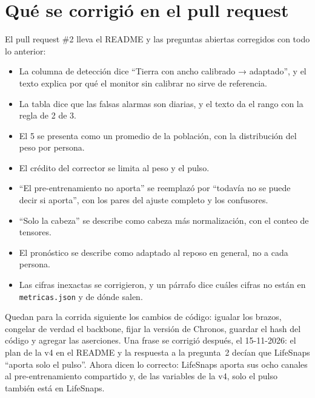 \section{Qué se corrigió en el pull request}

El pull request \#2 lleva el README y las preguntas abiertas corregidos con todo lo anterior:
\begin{itemize}
\item La columna de detección dice \enquote{Tierra con ancho calibrado → adaptado}, y el texto explica por qué el
  monitor sin calibrar no sirve de referencia.
\item La tabla dice que las falsas alarmas son diarias, y el texto da el rango con la regla de 2 de 3.
\item El 5\pct{} se presenta como un promedio de la población, con la distribución del peso por persona.
\item El crédito del corrector se limita al peso y el pulso.
\item \enquote{El pre-entrenamiento no aporta} se reemplazó por \enquote{todavía no se puede decir si aporta}, con los
  pares del ajuste completo y los confusores.
\item \enquote{Solo la cabeza} se describe como cabeza más normalización, con el conteo de tensores.
\item El pronóstico se describe como adaptado al reposo en general, no a cada persona.
\item Las cifras inexactas se corrigieron, y un párrafo dice cuáles cifras no están en \texttt{metricas.json} y de
  dónde salen.
\end{itemize}

Quedan para la corrida siguiente los cambios de código: igualar los brazos, congelar de verdad el backbone, fijar la
versión de Chronos, guardar el hash del código y agregar las aserciones. Una frase se corrigió después, el 15-11-2026:
el plan de la v4 en el README y la respuesta a la pregunta~2 decían que LifeSnaps \enquote{aporta solo el pulso}. Ahora
dicen lo correcto: LifeSnaps aporta sus ocho canales al pre-entrenamiento compartido y, de las variables de la v4,
solo el pulso también está en LifeSnaps.
